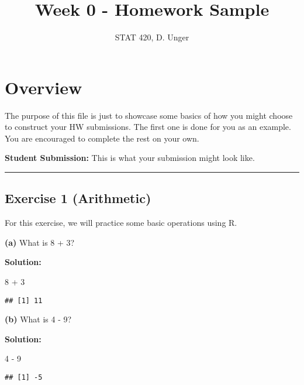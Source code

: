 \documentclass[
]{article}
\title{Week 0 - Homework Sample}
\author{STAT 420, D. Unger}
\date{}
\newenvironment{Shaded}{\begin{snugshade}}{\end{snugshade}}
\newcommand{\DecValTok}[1]{\textcolor[rgb]{0.00,0.00,0.81}{#1}}
\newcommand{\SpecialCharTok}[1]{\textcolor[rgb]{0.00,0.00,0.00}{#1}}
\begin{document}
\maketitle

{
\hypersetup{linkcolor=}
\setcounter{tocdepth}{2}
\tableofcontents
}
\hypertarget{overview}{%
\section{Overview}\label{overview}}

The purpose of this file is just to showcase some basics of how you
might choose to construct your HW submissions. The first one is done for
you as an example. You are encouraged to complete the rest on your own.

\textbf{Student Submission:} This is what your submission might look
like.

\begin{center}\rule{0.5\linewidth}{0.5pt}\end{center}

\hypertarget{exercise-1-arithmetic}{%
\subsection{Exercise 1 (Arithmetic)}\label{exercise-1-arithmetic}}

For this exercise, we will practice some basic operations using R.

\textbf{(a)} What is 8 + 3?

\textbf{Solution:}

\begin{Shaded}
\begin{Highlighting}[]
\DecValTok{8} \SpecialCharTok{+} \DecValTok{3}
\end{Highlighting}
\end{Shaded}

\begin{verbatim}
## [1] 11
\end{verbatim}

\textbf{(b)} What is 4 - 9?

\textbf{Solution:}

\begin{Shaded}
\begin{Highlighting}[]
\DecValTok{4} \SpecialCharTok{{-}} \DecValTok{9}
\end{Highlighting}
\end{Shaded}

\begin{verbatim}
## [1] -5
\end{verbatim}
\end{document}
